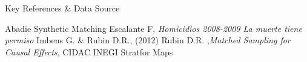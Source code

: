 \documentclass[final]{beamer}
\newlength{\sepwid}
\newlength{\onecolwid}
\begin{document}
\begin{frame}[t]
\begin{columns}[t]
\begin{column}{\onecolwid}
\begin{block}{Key References \& Data Source}
        
        \small{\begin{thebibliography}{99}
           Abadie  Synthetic Matching 
           Escalante F, \emph{Homicidios 2008-2009 La muerte tiene permiso}
           Imbens G. \& Rubin D.R., (2012)
           Rubin D.R. ,\emph{Matched Sampling for Causal Effects},
           CIDAC
           INEGI
           Stratfor Maps
          \end{thebibliography}}
        
      \end{block}
    \end{column}
  \end{columns}
\end{frame}
\end{document}
